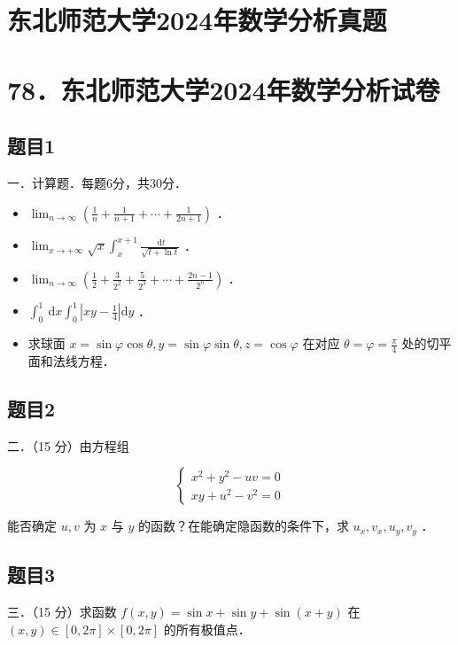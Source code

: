 \documentclass{article}
\begin{document}
\section*{东北师范大学2024年数学分析真题}
\section*{78．东北师范大学2024年数学分析试卷}

\subsection{题目1}
一．计算题．每题6分，共30分．

\begin{itemize}
  \item[（1）] \(\lim _{n \rightarrow \infty}\left(\frac{1}{n}+\frac{1}{n+1}+\cdots+\frac{1}{2 n+1}\right)\) ．
  \item[（2）] \(\lim _{x \rightarrow+\infty} \sqrt{x} \int_{x}^{x+1} \frac{\mathrm{~d} t}{\sqrt{t+\ln t}}\) ．
  \item[（3）] \(\lim _{n \rightarrow \infty}\left(\frac{1}{2}+\frac{3}{2^{2}}+\frac{5}{2^{3}}+\cdots+\frac{2 n-1}{2^{n}}\right)\) ．
  \item[（4）] \(\int_{0}^{1} \mathrm{~d} x \int_{0}^{1}\left|x y-\frac{1}{4}\right| \mathrm{d} y\) ．
  \item[（5）] 求球面 \(x=\sin \varphi \cos \theta, y=\sin \varphi \sin \theta, z=\cos \varphi\) 在对应 \(\theta=\varphi=\frac{\pi}{4}\) 处的切平面和法线方程．
\end{itemize}

\subsection{题目2}
二．（15 分）由方程组

\[
\left\{\begin{array}{l}
x^{2}+y^{2}-u v=0 \\
x y+u^{2}-v^{2}=0
\end{array}\right.
\]

能否确定 \(u, v\) 为 \(x\) 与 \(y\) 的函数？在能确定隐函数的条件下，求 \(u_{x}, v_{x}, u_{y}, v_{y}\) ．

\subsection{题目3}
三．（15 分）求函数 \(f(x, y)=\sin x+\sin y+\sin (x+y)\) 在 \((x, y) \in[0,2 \pi] \times[0,2 \pi]\) 的所有极值点．
\end{document}
